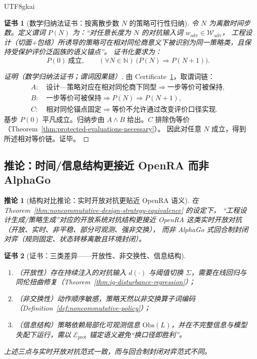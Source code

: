 \documentclass[12pt]{article}
\newtheorem{corollary}{推论}[section]
\newtheorem{certificate}{证书}[section]
\begin{document}
\begin{CJK*}{UTF8}{gkai}
\begin{certificate}[数学归纳法证书：按离散步数 $N$ 的策略可行性归纳]
\label{cert:noncommutative-design-strategy-equivalence-induction}
令 $N$ 为离散时间步数。定义谓词 $P(N)$ 为：“对任意长度为 $N$ 的对抗输入词 $w_{\mathrm{adv}}\in\mathcal{W}_{\mathrm{adv}}$，
工程设计（切面+包络）所诱导的策略可在相对同伦商意义下被识别为同一策略类，且保持受保护评价泛函族的语义锚点”。
证书化要求为：
\[
P(0)\ \text{成立},\qquad
(\forall N\in\mathbb{N})\ \bigl(P(N)\Rightarrow P(N+1)\bigr).
\]
\end{certificate}

\begin{proof}[证明（数学归纳法证书；谓词因果链）]
由 Certificate~\ref{cert:noncommutative-design-strategy-equivalence-induction}，取谓词链：
\[
\begin{aligned}
A:&\ \text{设计—策略对应在相对同伦商下同型}\Rightarrow \text{一步等价可被保持},\\
B:&\ \text{一步等价可被保持}\Rightarrow P(N)\Rightarrow P(N+1),\\
C:&\ \text{相对同伦锚点固定}\Rightarrow \text{等价不允许通过改变评价口径实现}.
\end{aligned}
\]
基步 $P(0)$ 平凡成立。归纳步由 $A\wedge B$ 给出。$C$ 排除伪等价（Theorem~\ref{thm:protected-evaluations-necessary}）。
因此对任意 $N$ 成立，得到所述相对等价链。证毕。
\end{proof}

\subsection{推论：时间/信息结构更接近 \textsf{OpenRA} 而非 \textsf{AlphaGo}}

\begin{corollary}[结构对比推论：实时开放对抗更贴近 \textsf{OpenRA} 语义]
\label{cor:openra-vs-alphago}
在 Theorem~\ref{thm:noncommutative-design-strategy-equivalence} 的设定下，
“工程设计生成/策略生成”对应的开放系统对抗结构更接近 \textsf{OpenRA} 这类实时开放对抗（开放、实时、非平稳、部分可观测、强非交换），
而非 \textsf{AlphaGo} 式回合制封闭对弈（规则固定、状态转移离散且环境封闭）。
\end{corollary}

\begin{certificate}[证书：三类差异——开放性、非交换性、信息结构]
\label{cert:openra-vs-alphago}
\begin{enumerate}
  \item（开放性）存在持续注入的对抗输入 $d(\cdot)$ 与阈值切换 $\Sigma$，需要在线回归与同伦扭曲修复（Theorem~\ref{thm:ig-disturbance-regression}）；
  \item（非交换性）动作顺序敏感，策略天然以非交换算子词编码（Definition~\ref{def:noncommutative-policy}）；
  \item（信息结构）策略依赖局部化可观测信息 $\mathrm{Obs}(L)$，并在不完整信息与模型失配下运行，需以 $\mathcal{E}_{\mathrm{prot}}$ 锚定语义避免“换口径即胜利”。
\end{enumerate}
上述三点与实时开放对抗范式一致，而与回合制封闭对弈范式不同。
\end{certificate}


\end{CJK*}
\end{document}

